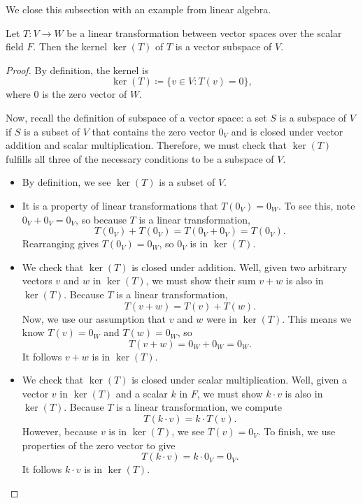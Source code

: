 \documentclass[../main.tex]{subfiles}
\begin{document}
We close this subsection with an example from linear algebra.
\begin{example} %
    Let $T\colon V \to W$ be a linear transformation between vector spaces over the scalar field $F$. Then the kernel $\ker(T)$ of $T$ is a vector subspace of $V$.
\end{example}
\begin{proof}
    By definition, the kernel is
    \[\ker(T) \coloneqq \{v \in V: T(v) = 0\},\]
    where $0$ is the zero vector of $W$.
    
    Now, recall the definition of subspace of a vector space: a set $S$ is a subspace of $V$ if $S$ is a subset of $V$ that contains the zero vector $0_V$ and is closed under vector addition and scalar multiplication. Therefore, we must check that $\ker(T)$ fulfills all three of the necessary conditions to be a subspace of $V$.
    \begin{itemize}
        \item By definition, we see $\ker(T)$ is a subset of $V$.
        \item It is a property of linear transformations that $T(0_V)=0_W$. To see this, note $0_V+0_V=0_V$, so because $T$ is a linear transformation,
        \[T(0_V)+T(0_V)=T(0_V+0_V)=T(0_V).\]
        Rearranging gives $T(0_V)=0_W$, so $0_V$ is in $\ker(T)$.
        \item We check that $\ker(T)$ is closed under addition. Well, given two arbitrary vectors $v$ and $w$ in $\ker(T)$, we must show their sum $v+w$ is also in $\ker(T)$. Because $T$ is a linear transformation,
        \[T(v+w)=T(v)+T(w).\]
        Now, we use our assumption that $v$ and $w$ were in $\ker(T)$. This means we know $T(v) = 0_W$ and $T(w) = 0_W$, so
        \[T(v+w)=0_W+0_W=0_W.\]
        It follows $v+w$ is in $\ker(T)$.
        \item We check that $\ker(T)$ is closed under scalar multiplication. Well, given a vector $v$ in $\ker(T)$ and a scalar $k$ in $F$, we must show $k\cdot v$ is also in $\ker(T)$. Because $T$ is a linear transformation, we compute
        \[T(k\cdot v)=k\cdot T(v).\]
        However, because $v$ is in $\ker(T)$, we see $T(v)=0_V$. To finish, we use properties of the zero vector to give
        \[T(k\cdot v)=k\cdot 0_V=0_V.\]
        It follows $k\cdot v$ is in $\ker(T)$.
        \qedhere
    \end{itemize}
\end{proof}
\end{document}
